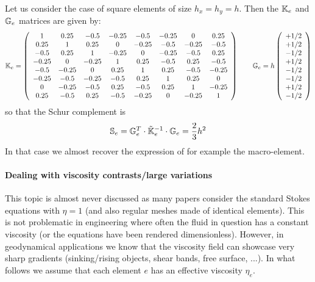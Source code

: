 \vspace{.5cm}


Let us consider the case of square elements of size $h_x=h_y=h$. Then the ${\mathbb{K}}_e$ and ${\mathbb{G}}_e$ matrices are given by:
\[
{\mathbb{K}}_e=
\left(
\begin{array}{cccccccc}
1    & 0.25 & -0.5 & -0.25 & -0.5  & -0.25 & 0     & 0.25 \\
0.25 & 1    & 0.25 & 0     & -0.25 & -0.5  & -0.25 & -0.5 \\
-0.5 & 0.25 & 1    & -0.25 &     0 & -0.25 & - 0.5 & 0.25 \\
-0.25 & 0 & -0.25 & 1 & 0.25 & -0.5 & 0.25 & -0.5 \\
-0.5 & -0.25 & 0 & 0.25 & 1 & 0.25 & -0.5 & -0.25 \\
-0.25 & -0.5 & -0.25 & -0.5 & 0.25 & 1 & 0.25 & 0 \\
0 & -0.25 & -0.5 & 0.25 & -0.5 & 0.25 & 1 & -0.25 \\
0.25 & -0.5 & 0.25 & -0.5 & -0.25 & 0 & -0.25 & 1 
\end{array}
\right)
\qquad 
{\mathbb{G}}_e=h
\left(
\begin{array}{c}
+1/2\\
+1/2\\
-1/2\\
+1/2\\
-1/2\\
-1/2\\
+1/2\\
-1/2
\end{array}
\right)
\]
so that the Schur complement is 
\[
{\mathbb{S}}_e = {\mathbb{G}}^T_e \cdot \tilde{{\mathbb{K}}}_e^{-1} \cdot {\mathbb{G}}_e
= \frac{2}{3}h^2
\]
In that case we almost recover the expression of for example the macro-element. 


\vspace{.5cm}

\paragraph{Dealing with viscosity contrasts/large variations}


This topic is almost never discussed as many papers consider
the standard Stokes equations with $\eta=1$ (and also regular meshes made of identical elements). This is not 
problematic in engineering where often the fluid in question 
has a constant viscosity (or the equations have been rendered dimensionless). However, in geodynamical applications
we know that the viscosity field can showcase very sharp gradients (sinking/rising objects, shear bands, free surface, ...). In what follows we assume that each element $e$ has an effective viscosity $\eta_e$. 


